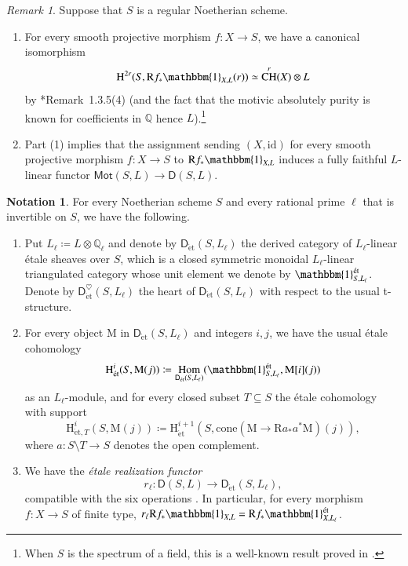 \documentclass[12pt]{amsart}
\numberwithin{equation}{section}
\theoremstyle{plain}
\theoremstyle{definition}
\newtheorem{notation}[proposition]{Notation}
\theoremstyle{remark}
\newtheorem{remark}[proposition]{Remark}
\renewcommand{\d}[1]{\mathbb{#1}}
\renewcommand{\r}[1]{\mathrm{#1}}
\renewcommand{\sf}[1]{\mathsf{#1}}
\renewcommand{\(}{\left(}
\renewcommand{\)}{\right)}
\newcommand{\dQ}{\d Q}
\newcommand{\rH}{\r H}
\newcommand{\rM}{\r M}
\newcommand{\rR}{\r R}
\newcommand{\sfD}{\sf D}
\newcommand{\et}{{\acute{\r{e}}\r{t}}}
\newcommand{\id}{\r{id}}
\newcommand{\Mot}{\sf{Mot}}
\DeclareMathOperator{\CH}{CH}
\DeclareMathOperator{\Hom}{Hom}
\begin{document}
\begin{remark}\label{re:relative_motivic}
Suppose that $S$ is a regular Noetherian scheme.
\begin{enumerate}
  \item For every smooth projective morphism $f\colon X\to S$, we have a canonical isomorphism
      \[
      \rH^{2r}(S,\rR f_*\mathbbm{1}_{X,L}(r))\simeq\CH^r(X)\otimes L
      \]
      by \cite{Deg18}*{Remark~1.3.5(4)} (and the fact that the motivic absolutely purity is known for coefficients in $\dQ$ hence $L$).\footnote{When $S$ is the spectrum of a field, this is a well-known result proved in \cite{Voe02}.}

  \item Part (1) implies that the assignment sending $(X,\id)$ for every smooth projective morphism $f\colon X\to S$ to $\rR f_*\mathbbm{1}_{X,L}$ induces a fully faithful $L$-linear functor $\Mot(S,L)\to\sfD(S,L)$.
\end{enumerate}
\end{remark}


\begin{notation}\label{no:relative_motive_etale}
For every Noetherian scheme $S$ and every rational prime $\ell$ that is invertible on $S$, we have the following.
\begin{enumerate}
  \item Put $L_\ell\coloneqq L\otimes\dQ_\ell$ and denote by $\sfD_{\et}(S,L_\ell)$ the derived category of $L_\ell$-linear \'{e}tale sheaves over $S$, which is a closed symmetric monoidal $L_\ell$-linear triangulated category whose unit element we denote by $\mathbbm{1}^\et_{S,L_\ell}$. Denote by $\sfD_{\et}^\heartsuit(S,L_\ell)$ the heart of $\sfD_{\et}(S,L_\ell)$ with respect to the usual t-structure.

  \item For every object $\rM$ in $\sfD_{\et}(S,L_\ell)$ and integers $i,j$, we have the usual \'{e}tale cohomology
      \[
      \rH^i_{\et}(S,\rM(j))\coloneqq\Hom_{\sfD_{\et}(S,L_\ell)}(\mathbbm{1}^\et_{S,L_\ell},\rM[i](j))
      \]
      as an $L_\ell$-module, and for every closed subset $T\subseteq S$ the \'{e}tale cohomology with support
      \[
      \rH^i_{\et,T}(S,\rM(j))\coloneqq\rH^{i+1}_{\et}(S,\r{cone}(\rM\to\rR a_* a^*\rM)(j)),
      \]
      where $a\colon S\setminus T\to S$ denotes the open complement.

  \item We have the \emph{\'{e}tale realization functor}
      \[
      r_\ell\colon\sfD(S,L)\to\sfD_{\et}(S,L_\ell),
      \]
      compatible with the six operations \cite{Ayo14}. In particular, for every morphism $f\colon X\to S$ of finite type, $r_\ell\rR f_*\mathbbm{1}_{X,L}=\rR f_*\mathbbm{1}^\et_{X,L_\ell}$.
\end{enumerate}
\end{notation}
\end{document}
